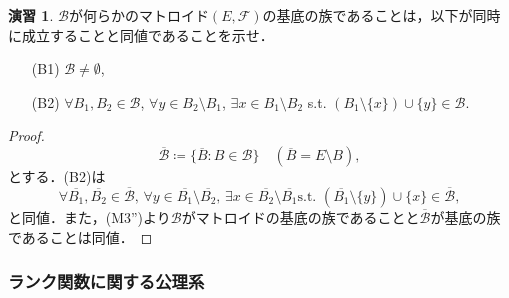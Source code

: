 \documentclass[xelatex,ja=standard,a4paper,14pt,everyparhook=compat]{bxjsarticle}
\theoremstyle{definition}
\newtheorem{exercise}{演習}
\begin{document}
\setcounter{exercise}{7}
\begin{exercise}
    $\mathcal{B}$が何らかのマトロイド$(E, \mathcal{F})$の基底の族であることは，以下が同時に成立することと同値であることを示せ． \begin{enumerate}
        \item[(B1)] $\mathcal{B} \neq \emptyset$,
        \item[(B2)] $\forall B_1, B_2 \in \mathcal{B}$, $\forall y \in B_2 \setminus B_1$, $\exists x \in B_1 \setminus B_2$ s.t. $(B_1 \setminus \{x\}) \cup \{y\} \in \mathcal{B}$.
    \end{enumerate}
\end{exercise}
\begin{proof}
    \begin{equation*}
        \overline{\mathcal{B}} \coloneqq \{\overline{B} : B \in \mathcal{B}\} \quad (\overline{B} = E \setminus B),
    \end{equation*}
    とする．(B2)は \begin{equation*}
        \text{$\forall \overline{B_1}, \overline{B_2} \in \overline{\mathcal{B}}$,
            $\forall y \in \overline{B_1} \setminus \overline{B_2}$,
            $\exists x \in \overline{B_2} \setminus \overline{B_1}$
            s.t. $(\overline{B_1} \setminus \{y\}) \cup \{x\} \in \overline{\mathcal{B}}$},
    \end{equation*}
    と同値．また，(M3'')より$\mathcal{B}$がマトロイドの基底の族であることと$\overline{\mathcal{B}}$が基底の族であることは同値．
\end{proof}

\newpage

\subsubsection*{ランク関数に関する公理系}
\end{document}
